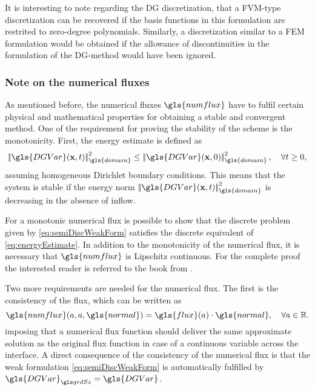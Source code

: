 It is interesting to note regarding the DG discretization, that a \gls{FVM}-type  discretization can be recovered if the basis functions in this formulation are restrited to zero-degree polynomials. Similarly, a discretization similar to a \gls{FEM} formulation would be obtained if the allowance of discontinuities in the formulation of the DG-method would have been ignored.
\subsubsection{Note on the numerical fluxes}
As mentioned before, the numerical fluxes $\gls{numflux}$ have to fulfil certain physical and mathematical properties for obtaining a stable and convergent method. One of the requirement for proving the stability of the scheme is the monotonicity. First, the energy estimate is defined as
\begin{equation}
	\norm{\gls{DGVar}(\vectr{x},t)}_{\gls{domain}}^2 \leq \norm{\gls{DGVar}(\vectr{x},0)}_{\gls{domain}}^2, \quad \forall t \geq 0,
	\label{eq:energyEstimate}
\end{equation}
assuming homogeneous Dirichlet boundary conditions. This means that the system is stable if the energy norm $\norm{\gls{DGVar}(\vectr{x},t)}_{\gls{domain}}^2 $ is  decreasing in the absence of inflow. 

For a monotonic numerical flux is possible to show that the discrete problem  given by \cref{eq:semiDiscWeakForm} satisfies the discrete equivalent of \cref{eq:energyEstimate}. In addition to the monotonicity of the numerical flux, it is necessary that $\gls{numflux}$ is Lipschitz continuous.%
For the complete proof the interested reader is referred to the book from \textcite{dipietroMathematicalAspectsDiscontinuous2012}.

Two more requirements are needed for the numerical flux. The first is the consistency of the flux, which can be written as
\begin{equation}
	\gls{numflux}(a,a,\gls{normal}) = \gls{flux}(a) \cdot \gls{normal}, \quad \forall a \in \mathbb{R}. 
	\label{eq:consistency}
\end{equation}
imposing that a numerical flux function should deliver the same approximate solution as the original flux function in case of a continuous variable across the interface. A direct consequence of the consistency of the numerical flux is that the weak formulation \cref{eq:semiDiscWeakForm} is automatically fulfilled by $\nuM{\gls{DGVar}} = \gls{DGVar}$.

